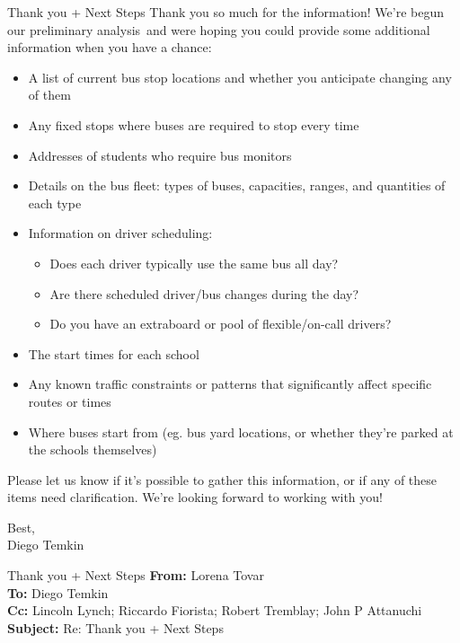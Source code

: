 {\begin{emailbox}{Thank you + Next Steps}
   Thank you so much for the information! We're begun our preliminary analysis and were hoping you could provide some additional information when you have a chance:

    \begin{itemize}
        \item A list of current bus stop locations and whether you anticipate changing any of them
        \item Any fixed stops where buses are required to stop every time
        \item Addresses of students who require bus monitors
        \item Details on the bus fleet: types of buses, capacities, ranges, and quantities of each type
        \item Information on driver scheduling:
        \begin{itemize}
            \item Does each driver typically use the same bus all day?
            \item Are there scheduled driver/bus changes during the day?
            \item Do you have an extraboard or pool of flexible/on-call drivers?
        \end{itemize}
        \item The start times for each school
        \item Any known traffic constraints or patterns that significantly affect specific routes or times
        \item Where buses start from (eg. bus yard locations, or whether they're parked at the schools themselves)
    \end{itemize}

    Please let us know if it’s possible to gather this information, or if any of these items need clarification. We’re looking forward to working with you! \vspace{1em}

    Best, \\
    Diego Temkin
\end{emailbox}

\begin{emailbox}{Thank you + Next Steps}
    \textbf{From:} Lorena Tovar \\
    \textbf{To:} Diego Temkin \\
    \textbf{Cc:} Lincoln Lynch; Riccardo Fiorista; Robert Tremblay; John P Attanuchi \\
    \textbf{Subject:} Re: Thank you + Next Steps


\end{emailbox}}
